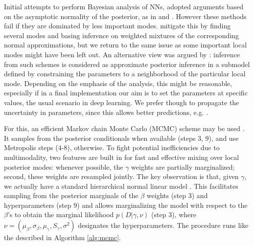 Initial attempts to perform Bayesian analysis
of NNs, adopted
arguments based on the asymptotic normality of the posterior, 
as in  
\cite{mckay} and \cite{buntineweigend}. However these methods
fail if they are dominated by  
less important modes. %
 \cite{buntineweigend} mitigate this by finding several modes and
basing inference on weighted mixtures of the corresponding normal approximations, but we return to the same issue as some
important local modes might have been left out. An alternative view was argued
by \cite{mckay}: inference from such schemes is 
 considered as approximate
posterior inference in a submodel defined by constraining the
parameters to a neighborhood of the particular local mode. Depending on
the emphasis of the analysis, this might be reasonable, especially if in a final
implementation our aim is to set the parameters at specific values,
the usual scenario in deep learning. We prefer
though to propagate the uncertainty in parameters, since this allows
better predictions, e.g. \cite{raftery}. 

For this, an efficient 
Markov chain Monte Carlo (MCMC) scheme
may be used \cite{muller1998issues}. It 
 samples from the posterior conditionals when available (steps 3, 9), and use
Metropolis steps (4-8), otherwise. To fight potential inefficiencies due to
multimodality, two features are built in 
 for
fast and effective mixing over local posterior modes:
whenever
possible, the $\gamma$ weights are 
partially marginalized; second,
these weights are resampled jointly.
The key observation is that,
given
 $\gamma $,
we actually have a standard hierarchical normal linear
model \cite{french}. This facilitates sampling from the posterior marginals of the $\beta $ weights (step 3)
 and hyperparameters (step 9) and 
 allows marginalizing the model with respect
 to the $\beta$'s
  to obtain the marginal likelihood $p(D|\gamma, \nu)$
  (step 3), where $\nu=(\mu_\beta,\sigma_\beta,\mu_\gamma,S_\gamma,\sigma^2)$ designates the hyperparameters.
The procedure runs like the described in Algorithm \ref{alg:mcmc}.

